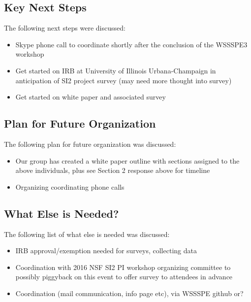 \subsection{Key Next Steps}

The following next steps were discussed:

\begin{itemize}
\item
Skype phone call to coordinate shortly after the conclusion of the WSSSPE3 workshop

\item
Get started on IRB at University of Illinois Urbana-Champaign in anticipation of SI2 project survey (may need more thought into survey)

\item
Get started on white paper and associated survey

\end{itemize}



\subsection{Plan for Future Organization}

The following plan for future organization was discussed:

\begin{itemize}
\item
Our group has created a white paper outline with sections assigned to the above individuals, plus see Section 2 response above for timeline

\item
Organizing coordinating phone calls

\end{itemize}




\subsection{What Else is Needed?}

The following list of what else is needed was discussed:

\begin{itemize}
\item
IRB approval/exemption needed for surveys, collecting data

\item
Coordination with 2016 NSF SI2 PI workshop organizing committee to possibly piggyback on this event to offer survey to attendees in advance

\item
Coordination (mail communication, info page etc), via WSSSPE github or?

\end{itemize}



